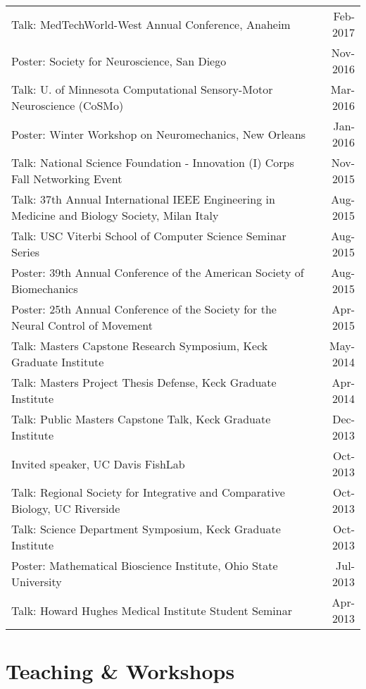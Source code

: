 \documentclass[10pt,a4paper]{article}
\begin{document}
  \vspace*{1mm}\noindent\begin{tabularx}{17cm}{X r}
    Talk: MedTechWorld-West Annual Conference, Anaheim & Feb-2017\\
    Poster: Society for Neuroscience, San Diego & Nov-2016 \\ 
    Talk: U. of Minnesota Computational Sensory-Motor Neuroscience (CoSMo)& Mar-2016 \\
    Poster: Winter Workshop on Neuromechanics, New Orleans & Jan-2016 \\ %
      Talk: National Science Foundation - Innovation (I) Corps Fall Networking Event & Nov-2015\\
    Talk: 37th Annual International IEEE Engineering in Medicine and Biology Society, Milan Italy & Aug-2015 \\
    Talk: USC Viterbi School of Computer Science Seminar Series & Aug-2015 \\
    Poster: 39th Annual Conference of the American Society of Biomechanics & Aug-2015 \\
    Poster: 25th Annual Conference of the Society for the Neural Control of Movement & Apr-2015 \\
    Talk: Masters Capstone Research Symposium, Keck Graduate Institute & May-2014 \\
    Talk: Masters Project Thesis Defense, Keck Graduate Institute & Apr-2014 \\
    Talk: Public Masters Capstone Talk, Keck Graduate Institute & Dec-2013 \\
    Invited speaker, UC Davis FishLab & Oct-2013 \\
    Talk: Regional Society for Integrative and Comparative Biology, UC Riverside & Oct-2013 \\
    Talk: Science Department Symposium, Keck Graduate Institute & Oct-2013 \\
    Poster: Mathematical Bioscience Institute, Ohio State University & Jul-2013\\
    Talk: Howard Hughes Medical Institute Student Seminar & Apr-2013 \\
  \end{tabularx}

  \vspace*{2mm}\section*{Teaching \& Workshops}
\end{document}
